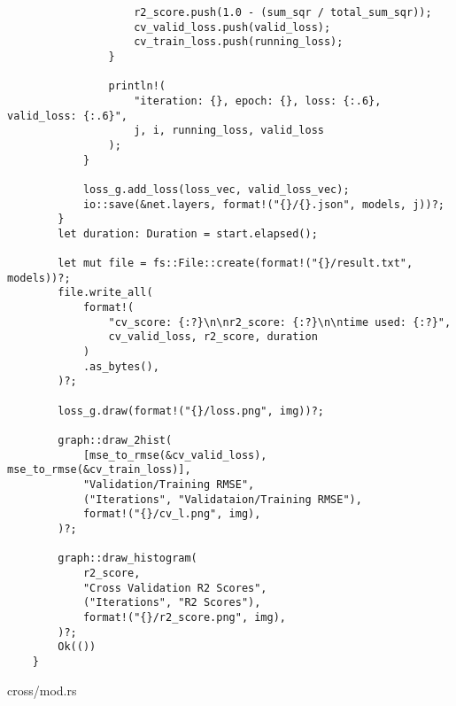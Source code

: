 \begin{verbatim}
                    r2_score.push(1.0 - (sum_sqr / total_sum_sqr));
                    cv_valid_loss.push(valid_loss);
                    cv_train_loss.push(running_loss);
                }
    
                println!(
                    "iteration: {}, epoch: {}, loss: {:.6}, valid_loss: {:.6}",
                    j, i, running_loss, valid_loss
                );
            }
    
            loss_g.add_loss(loss_vec, valid_loss_vec);
            io::save(&net.layers, format!("{}/{}.json", models, j))?;
        }
        let duration: Duration = start.elapsed();
    
        let mut file = fs::File::create(format!("{}/result.txt", models))?;
        file.write_all(
            format!(
                "cv_score: {:?}\n\nr2_score: {:?}\n\ntime used: {:?}",
                cv_valid_loss, r2_score, duration
            )
            .as_bytes(),
        )?;
    
        loss_g.draw(format!("{}/loss.png", img))?;
    
        graph::draw_2hist(
            [mse_to_rmse(&cv_valid_loss), mse_to_rmse(&cv_train_loss)],
            "Validation/Training RMSE",
            ("Iterations", "Validataion/Training RMSE"),
            format!("{}/cv_l.png", img),
        )?;
    
        graph::draw_histogram(
            r2_score,
            "Cross Validation R2 Scores",
            ("Iterations", "R2 Scores"),
            format!("{}/r2_score.png", img),
        )?;
        Ok(())
    }
\end{verbatim}
\noindent cross/mod.rs
